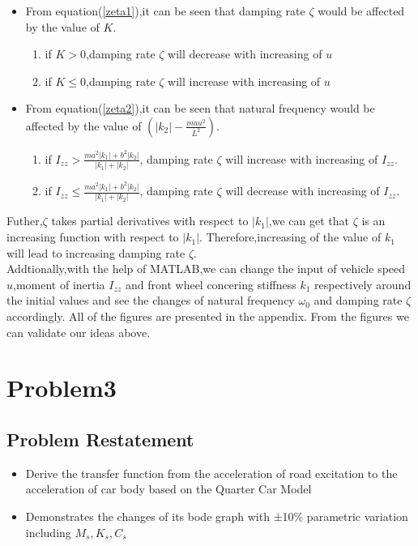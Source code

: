 \documentclass[UTF8,a4paper,11pt]{article}
\begin{document}
\begin{itemize}
\item From equation(\ref{zeta1}),it can be seen that damping rate $\zeta$ would be affected by the value of $K$.
	\begin{enumerate}
	\item if $K > 0$,damping rate $\zeta$ will decrease with increasing of $u$
	\item if $K \le 0$,damping rate $\zeta$ will increase with increasing of $u$
	\end{enumerate}
\item From equation(\ref{zeta2}),it can be seen that natural frequency would be affected by the value of $\left(\left|k_{2}\right|-\frac{m a u^{2}}{L^{2}}\right)$. 
	\begin{enumerate}
	\item if $I_{zz} > \frac{ma^2|k_1|+b^2|k_2|}{|k_1|+|k_2|}$, damping rate $\zeta$ will increase with increasing of $I_{zz}$.
	\item if $I_{zz} \le \frac{ma^2|k_1|+b^2|k_2|}{|k_1|+|k_2|}$, damping rate $\zeta$ will decrease with increasing of $I_{zz}$.
	\end{enumerate}
\end{itemize}
 Futher,$\zeta$ takes partial derivatives with respect to $|k_1|$,we can get that $\zeta$ is an increasing function with respect to $|k_1|$. Therefore,increasing of the value of $k_1$ will lead to increasing damping rate $\zeta$.
\\Addtionally,with the help of MATLAB,we can change the input of vehicle speed $u$,moment of inertia $I_{zz}$ and front wheel concering stiffness $k_1$ respectively around the initial values and see the changes of natural frequency $\omega_0$ and damping rate $\zeta$ accordingly. All of the figures are presented in the appendix. From the figures we can validate our ideas above.

\section{Problem3}
\subsection{Problem Restatement}
\begin{itemize}
\item Derive the transfer function from the acceleration of road excitation to the acceleration of car body based on the Quarter Car Model
\item Demonstrates the changes of its bode graph with ±10\% parametric variation including $M_s,K_s,C_s$
\end{itemize}
\end{document}
